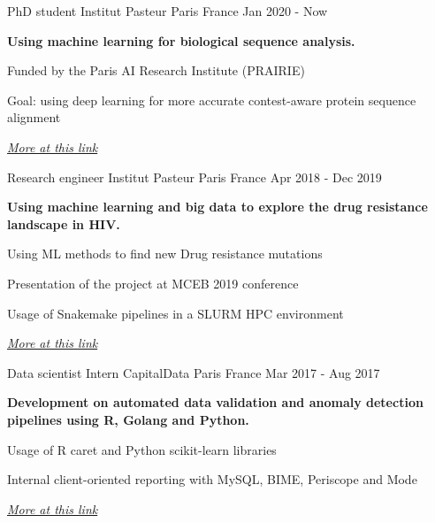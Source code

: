 \documentclass[11pt, a4paper]{awesome-cv}
\begin{document}
\makecvheader
{}

\begin{cventries}
\cventry
{PhD student}
{Institut Pasteur}
{Paris France}
{Jan 2020 - Now}
{
\begin{cvitems}
\item{\textbf{Using machine learning for biological sequence analysis.}}
\item{Funded by the Paris AI Research Institute (PRAIRIE)}
\item{Goal: using deep learning for more accurate contest-aware protein sequence alignment}
\item{\emph{\href{https://research.pasteur.fr/en/project/applying-machine-learning-to-sequence-analysis-phd-luc-blassel-prairie/}{More at this link}}}
\end{cvitems}
}


\cventry
{Research engineer}
{Institut Pasteur}
{Paris France}
{Apr 2018 - Dec 2019}
{
\begin{cvitems}
\item{\textbf{Using machine learning and big data to explore the drug resistance landscape in HIV.}}
\item{Using ML methods to find new Drug resistance mutations}
\item{Presentation of the project at MCEB 2019 conference}
\item{Usage of Snakemake pipelines in a SLURM HPC environment}
\item{\emph{\href{https://research.pasteur.fr/en/project/drm-hiv/}{More at this link}}}
\end{cvitems}
}


\cventry
{Data scientist Intern}
{CapitalData}
{Paris France}
{Mar 2017 - Aug 2017}
{
\begin{cvitems}
\item{\textbf{Development on automated data validation and anomaly detection pipelines using R, Golang and Python.}}
\item{Usage of R caret and Python scikit-learn libraries}
\item{Internal client-oriented reporting with MySQL, BIME, Periscope and Mode}
\item{\emph{\href{https://www.capitaldata.fr/}{More at this link}}}
\end{cvitems}
}
\end{cventries}
\end{document}
